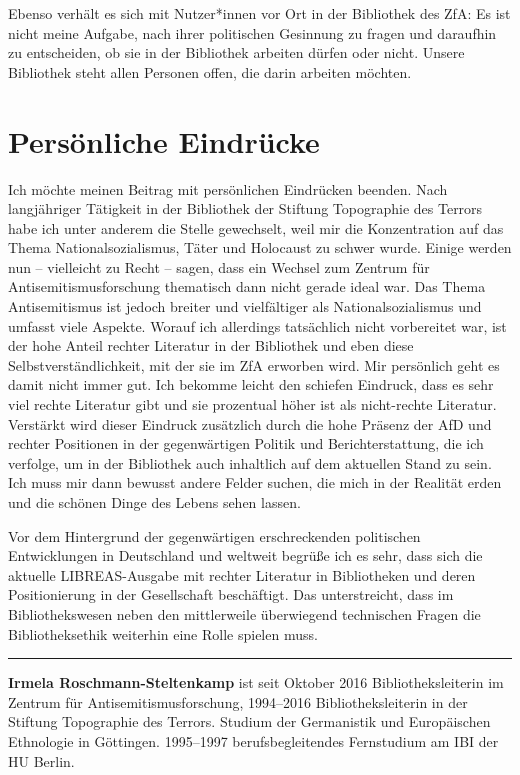 \documentclass[a4paper,
fontsize=11pt,
oneside,
numbers=noperiodatend,
parskip=half-,
bibliography=totoc,
final
]{scrartcl}
\begin{document}
Ebenso verhält es sich mit Nutzer*innen vor Ort in der Bibliothek des
ZfA: Es ist nicht meine Aufgabe, nach ihrer politischen Gesinnung zu
fragen und daraufhin zu entscheiden, ob sie in der Bibliothek arbeiten
dürfen oder nicht. Unsere Bibliothek steht allen Personen offen, die
darin arbeiten möchten.

\hypertarget{persuxf6nliche-eindruxfccke}{%
\section{Persönliche
Eindrücke}\label{persuxf6nliche-eindruxfccke}}

Ich möchte meinen Beitrag mit persönlichen Eindrücken beenden. Nach
langjähriger Tätigkeit in der Bibliothek der Stiftung Topographie des
Terrors habe ich unter anderem die Stelle gewechselt, weil mir die
Konzentration auf das Thema Nationalsozialismus, Täter und Holocaust zu
schwer wurde. Einige werden nun -- vielleicht zu Recht -- sagen, dass
ein Wechsel zum Zentrum für Antisemitismusforschung thematisch dann
nicht gerade ideal war. Das Thema Antisemitismus ist jedoch breiter und
vielfältiger als Nationalsozialismus und umfasst viele Aspekte. Worauf
ich allerdings tatsächlich nicht vorbereitet war, ist der hohe Anteil
rechter Literatur in der Bibliothek und eben diese
Selbstverständlichkeit, mit der sie im ZfA erworben wird. Mir persönlich
geht es damit nicht immer gut. Ich bekomme leicht den schiefen Eindruck,
dass es sehr viel rechte Literatur gibt und sie prozentual höher ist als
nicht-rechte Literatur. Verstärkt wird dieser Eindruck zusätzlich durch
die hohe Präsenz der AfD und rechter Positionen in der gegenwärtigen
Politik und Berichterstattung, die ich verfolge, um in der Bibliothek
auch inhaltlich auf dem aktuellen Stand zu sein. Ich muss mir dann
bewusst andere Felder suchen, die mich in der Realität erden und die
schönen Dinge des Lebens sehen lassen.

Vor dem Hintergrund der gegenwärtigen erschreckenden politischen
Entwicklungen in Deutschland und weltweit begrüße ich es sehr, dass sich
die aktuelle LIBREAS-Ausgabe mit rechter Literatur in Bibliotheken und
deren Positionierung in der Gesellschaft beschäftigt. Das unterstreicht,
dass im Bibliothekswesen neben den mittlerweile überwiegend technischen
Fragen die Bibliotheksethik weiterhin eine Rolle spielen muss.

\begin{center}\rule{0.5\linewidth}{\linethickness}\end{center}

\textbf{Irmela Roschmann-Steltenkamp} ist seit Oktober 2016
Bibliotheksleiterin im Zentrum für Antisemitismusforschung, 1994--2016
Bibliotheksleiterin in der Stiftung Topographie des Terrors. Studium der
Germanistik und Europäischen Ethnologie in Göttingen. 1995--1997
berufsbegleitendes Fernstudium am IBI der HU Berlin.
\end{document}
